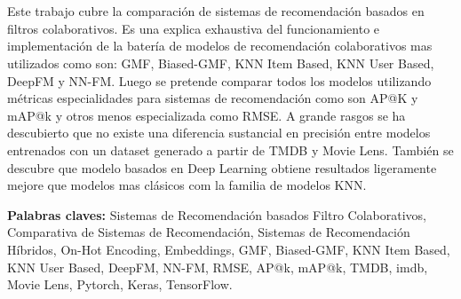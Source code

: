 \chapter*{\runtitulo}

\noindent Este trabajo cubre la comparación de sistemas de recomendación basados en filtros colaborativos. Es una explica exhaustiva del funcionamiento e implementación de la batería de modelos de recomendación colaborativos mas utilizados como son: GMF, Biased-GMF, KNN Item Based, KNN User Based, DeepFM y NN-FM. Luego se pretende comparar todos los modelos utilizando métricas especialidades para sistemas de recomendación como son AP@K y mAP@k y otros menos especializada como RMSE. A grande rasgos se ha descubierto que no existe una diferencia sustancial en precisión entre modelos entrenados con un dataset generado a partir de TMDB y Movie Lens. También se descubre que modelo basados en Deep Learning obtiene resultados ligeramente mejore que modelos mas clásicos com la familia de modelos KNN. 

\bigskip

\noindent\textbf{Palabras claves:} Sistemas de Recomendación basados Filtro Colaborativos, Comparativa de Sistemas de Recomendación, Sistemas de Recomendación Híbridos, On-Hot Encoding, Embeddings, GMF, Biased-GMF, KNN Item Based, KNN User Based, DeepFM, NN-FM, RMSE, AP@k, mAP@k, TMDB, imdb, Movie Lens, Pytorch, Keras, TensorFlow.
